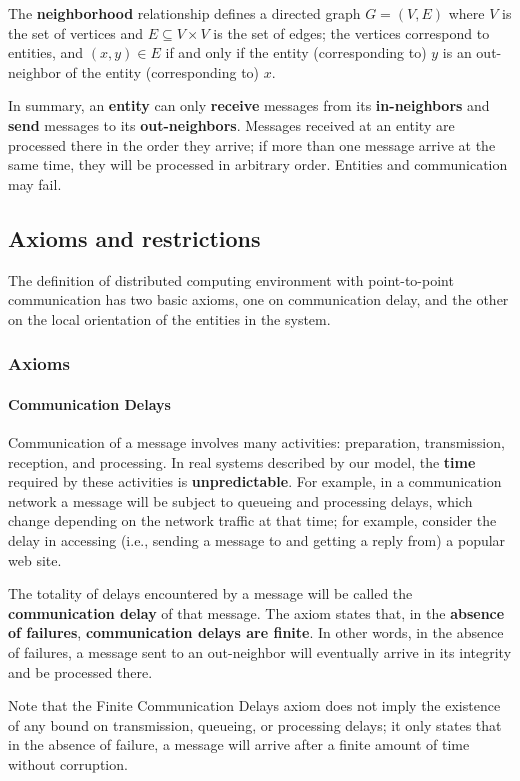 The \textbf{neighborhood} relationship defines a directed graph $G = (V,E)$ where $V$ is the set of vertices and $E \subseteq V \times V$ is the set of edges; the vertices correspond to entities, and $(x, y) \in 
E$ if and only if the entity (corresponding to) $y$ is an out-neighbor of the entity (corresponding to) $x$. 

In summary, an \textbf{entity} can only \textbf{receive} messages from its \textbf{in-neighbors} and \textbf{send} messages to its \textbf{out-neighbors}. Messages received at an entity are processed there in the order they arrive; if more than one message arrive at the same time, they will be processed in arbitrary order. Entities and communication may fail.

\subsection{Axioms and restrictions}
The definition of distributed computing environment with point-to-point communication has two basic axioms, one on communication delay, and the other on the local orientation of the entities in the system.

\subsubsection{Axioms}
\paragraph{Communication Delays} Communication of a message involves many activities: preparation, transmission, reception, and processing. In real systems described by our model, the \textbf{time} required by these activities is \textbf{unpredictable}. For example, in a communication network a message will be subject to queueing and processing delays, which change depending on the network traffic at that time; for example, consider the delay in accessing (i.e., sending a message to and getting a reply from) a popular web site. 

The totality of delays encountered by a message will be called the \textbf{communication delay} of that message. The axiom states that, in the \textbf{absence of failures}, \textbf{communication delays are finite}. In other words, in the absence of failures, a message sent to an out-neighbor will eventually arrive in its integrity and be processed there. 

Note that the Finite Communication Delays axiom does not imply the existence of any bound on transmission, queueing, or processing delays; it only states that in the absence of failure, a message will arrive after a finite amount of time without corruption.

